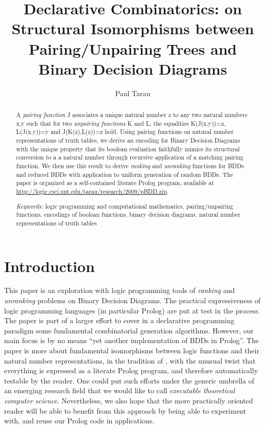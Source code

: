 \documentclass[]{INCLUDES/llncs}
\begin{document}
\title{
  Declarative Combinatorics: on Structural Isomorphisms between
  Pairing/Unpairing Trees and Binary Decision Diagrams}

\author{Paul Tarau}

\maketitle

\date{}

\begin{abstract}

A {\em pairing function} J associates a unique natural number z to any two 
natural numbers x,y such that for two {\em unpairing functions}
K and L, the equalities K(J(x,y))=x, L(J(x,y))=y and J(K(z),L(z))=z hold.
Using pairing functions on natural
number representations of truth tables, we derive 
an encoding for Binary Decision Diagrams with the unique property 
that its boolean evaluation faithfully mimics
its structural conversion to a a natural number
through recursive application of a matching pairing function.
We then use this result to derive {\em ranking} and {\em unranking}
functions for BDDs and reduced BDDs with application to uniform generation of
random BDDs. The paper is organized as a self-contained literate Prolog
program, available at \url{http://logic.csci.unt.edu/tarau/research/2009/pBDD.zip}.

{\em Keywords:} 
logic programming and computational mathematics,
pairing/unpairing functions,
encodings of boolean functions,
binary decision diagrams,
natural number representations of truth tables
\end{abstract}

\section{Introduction}

This paper is an exploration with logic programming tools of {\em ranking} and
{\em unranking} problems on Binary Decision Diagrams. The practical
expressiveness of logic programming languages (in particular Prolog) 
are put at test in the process. The paper is part
of a larger effort to cover in a declarative programming 
paradigm some fundamental combinatorial generation 
algorithms.
However, our main focus is by no means ``yet another implementation of BDDs in
Prolog''. The paper is more about fundamental
isomorphisms between logic functions
and their natural number representations, in the tradition of \cite{Goedel:31},
with the unusual twist that everything is expressed as a literate Prolog program,
and therefore automatically testable by the reader.
One could put such efforts under the generic umbrella of an emerging research
field that we would like to call {\em executable theoretical computer
science}. Nevertheless, we also hope that the more practically oriented reader 
will be able to benefit from this approach by being able to experiment with,
and reuse our Prolog code in applications.
\end{document}

